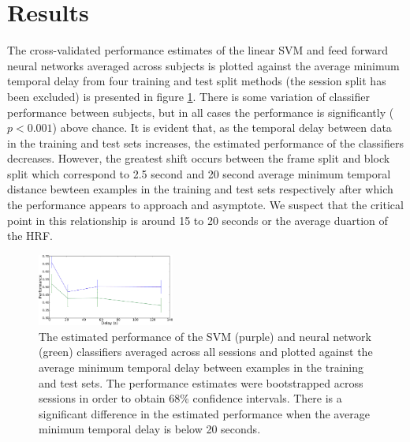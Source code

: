 \documentclass[preprint,5p,authoryear]{elsarticle}
\begin{document}
\section{Results}
The cross-validated performance estimates of the linear SVM and feed forward neural networks averaged across subjects is plotted against the average minimum temporal delay from four training and test split methods (the session split has been excluded) is presented in figure \ref{fig:performance-verse-temporal-distance}.
There is some variation of classifier performance between subjects, but in all cases the performance is significantly ($p < 0.001$) above chance. 
It is evident that, as the temporal delay between data in the training and test sets increases, the estimated performance of the classifiers decreases.
However, the greatest shift occurs between the frame split and block split which correspond to 2.5 second and 20 second average minimum temporal distance bewteen examples in the training and test sets respectively after which the performance appears to approach and asymptote.
We suspect that the critical point in this relationship is around 15 to 20 seconds or the average duartion of the HRF.

\begin{figure}
\centering
\includegraphics[width=0.4\textwidth]{figures/performance-verse-temporal-distance}
\caption{The estimated performance of the SVM (purple) and neural network (green) classifiers averaged across all sessions and plotted against the average minimum temporal delay between examples in the training and test sets. 
The performance estimates were bootstrapped across sessions in order to obtain 68\% confidence intervals.
There is a significant difference in the estimated performance when the average minimum temporal delay is below 20 seconds.}
\label{fig:performance-verse-temporal-distance}
\end{figure}
\end{document}
